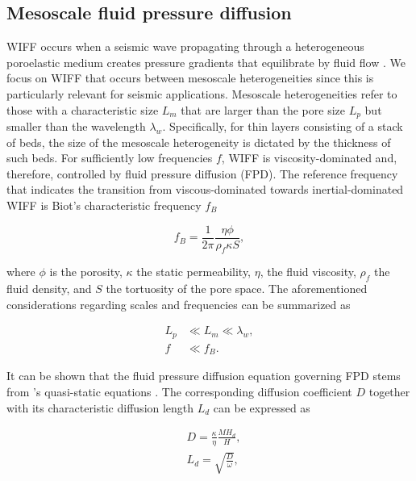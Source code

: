 \documentclass[draft]{agujournal2019}
\begin{document}
\subsection{Mesoscale fluid pressure diffusion}
WIFF occurs when a seismic wave propagating through a heterogeneous poroelastic medium creates
pressure gradients that equilibrate by fluid flow \cite{Muller2010}.
We focus on WIFF that occurs between mesoscale heterogeneities since this is particularly relevant for seismic applications. Mesoscale heterogeneities refer to those with a characteristic size $L_m$ that are larger than the pore size $L_p$ but smaller than the wavelength $\lambda_w$. Specifically, for thin layers consisting of a stack of beds, the size of the mesoscale heterogeneity is dictated by the thickness of such beds.
For sufficiently low frequencies $f$, WIFF is viscosity-dominated and, therefore, controlled by fluid pressure diffusion (FPD). The reference frequency that indicates the transition from viscous-dominated towards inertial-dominated WIFF is Biot's characteristic frequency $f_B$ \cite{Biot1956, Dutta1979}
\begin{linenomath*}
\begin{equation}\label{Eq.1}
f_B= \frac{1}{2 \pi} \frac{\eta \phi}{ \rho_f \kappa S },
\end{equation}
\end{linenomath*}
where $\phi$ is the porosity, $\kappa$  the static permeability, $\eta$, the fluid viscosity,  $\rho_f$ the fluid density, and $S$ the tortuosity of the pore space. The aforementioned considerations regarding scales and frequencies can be summarized as
\begin{linenomath*}
\begin{equation}\label{Eq.2}
\begin{split}
 L_p & \ll L_m \ll \lambda_w, \\
f & \ll f_B.
\end{split}
\end{equation}
\end{linenomath*}
It can be shown that the fluid pressure diffusion equation governing FPD stems from \citeauthor{Biot1941}'s \citeyear{Biot1941} quasi-static equations \cite{Dutta1979, Chandler1981, Norris1993}. The corresponding diffusion coefficient $D$  together with its characteristic diffusion length $L_d$ can be expressed as \cite{Norris1993}
\begin{linenomath*}
\begin{equation}\label{Eq.3}
\begin{split}
&D= \frac {\kappa} {\eta} \frac{M H_d}{H},\\
&L_d=\sqrt{\frac{D}{\omega}},
\end{split}
\end{equation}
\end{linenomath*}
\end{document}
